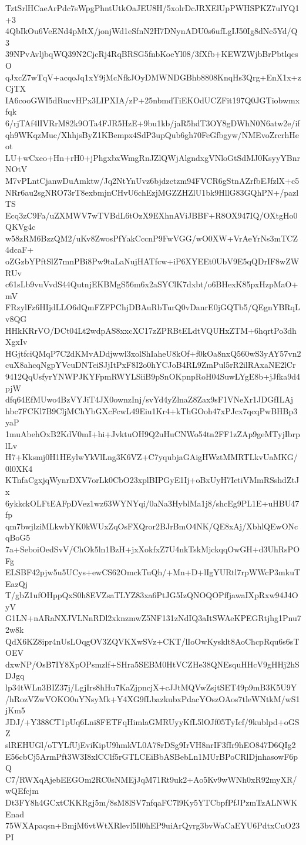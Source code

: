 TztSrlHCaeArPdc7sWpgPhntUtkOaJEU8H/5xolrDcJRXElUpPWHSPKZ7ulYQ1+3
4QbIkOu6VeENd4pMtX/jonjWd1eSfnN2H7DNynADU0s6ufLgIJ50Ig8dNc5Yd/Q3
39NPvAvljbqWQ39N2CjcRj4RqBRSG5fnbKoeYl08/3fXfb+KEWZWjbBrPbtlqcsO
qJxcZ7wTqV+acqoJq1xY9jMcNfkJOyDMWNDGBhb8808KnqHs3Qrg+EnX1x+zCjTX
IA6cooGWI5dRucvHPx3LIPXIA/zP+25nbmdTiEKOdUCZFit197Q0JGTiobwmxfqk
6/rjTAf4lIVRrM82k9OTa4FJR5HzE+9bu1kb/jaR5hdT3OY8gDWhN0N6atw2e/if
qh9WKqzMuc/XhhjsByZ1KBempx4SdP3upQub6gh70FeGfbgyw/NMEvoZrcrhHeot
LU+wCxeo+Hn+rH0+jPhgxbxWmgRnJZlQWjAlgndxgVNloGtSdMJ0KsyyYBnrNOtV
M7vPLntCjanwDuAmktw/Jq2NtYnUvz6bjdzctzm94FVCR6gStnAZrfbEJfzlX+c5
NRr6au2sgNRO73rT8exbmjnCHvU6chEzjMGZZHZlU1bk9HllG83GQhPN+/pazlTS
Ecq3zC9Fa/uZXMWV7wTVBdL6tOzX9EXhnAViJBBF+R8OX947IQ/OXtgHo0QKVg4c
w58zRM6BzzQM2/uKv8ZwosPfYakCccnP9FwVGG/wO0XW+VrAeYrNs3mTCZ4dcaF+
oZGzbYPftSlZ7mnPBi8Pw9taLaNujHATfcw+iP6XYEEt0UbV9E5qQDrIF8wZWRUv
c61sLb9vuVvdS44QutnjEKBMgS56m6x2aSYClK7dxbt/o6BHexK85pxHzpMaO+mV
FRzylFz6HIjdLLO6dQmFZFPChjDBAuRbTurQ0vDanrE0jGQTb5/QEgnYBRqLv8QG
HHkKRrVO/DCt04Lt2wdpAS8xxcXC17zZPRBtELdtVQUHxZTM+6hqrtPo3dhXgxIv
HGjtfciQMqP7C2dKMvADdjwwl3xolShIaheU8kOf+f0kOa8nxQ560wS3yAY57vn2
cuX8ahcqNgpYVcuDNTeiSJjItPxF8I2o0hYCJoB4RL9ZmPul5rR2ilRAxaNE2lCr
9412QqUsfyrYNWPJKYFpmRWYLSiiB9pSnOKpnpRoH04SuwLYgE8b+jJfka9d4pjW
dfq64EfMUwo4BzVYJiT4JX0ownzInj/svYd4yZlnaZ8Zax9sF1VNeXr1JDGfILAj
hbc7FCKl7B9CljMChYbGXcFcwL49Eiu1Kr4+kThGOoh47xPJcx7qcqPwBHBp3yaP
1muAbehOxB2KdV0mI+hi+JvktuOH9Q2uHuCNWo54tn2FF1zZAp9geMTyjIbrplLv
H7+Kksmj0H1HEylwYkVlLng3K6VZ+C7yqubjaGAigHWztMMRTLkvUaMKG/0l0XK4
KTnfaCgxjqWynrDXV7orLk0CbO23xplBIPGyE1Ij+oBxUyH7IetiVMmRSshdZtJx
6ykkckOLFtEAFpDVez1wz63WYNYqi/0aNa3HyblMa1j8/shcEg9PL1E+uHBU47fp
qm7bwjlziMLkwbYK0kWUxZqOsFXQror2BJrBmO4NK/QE8xAj/XbhlQEwONcqBoG5
7a+SeboiOedSvV/ChOk5ln1BzH+jxXokfxZ7U4nkTskMjckqqOwGH+d3UhRsPOFg
ELSBF42pjw5u5UCys+ewCS62OmckTuQh/+Mn+D+lIgYURtl7rpWWcP3mkuTEazQj
T/gbZ1ufOHppQxS0h8EVZsaTLYZ83xa6PtJG5IzQNOQOPffjawaIXpRxw94J4OyV
G1LN+nARaNXJVLNnRDl2xknzmwZ5NF131zNdIQ3aItSWAeKPEGRtjhg1Pnu72w8k
QdX6KZ8ipr4nUsLOqgOV3ZQVKXwSVz+CKT/lIoOwKysklt8AoChcpRqu6s6sTOEV
dxwNP/OsB7IY8XpOPsmzlf+SHra5SEBM0HtVCZHe38QNEsquHHcV9gHHj2hSDJgq
lp34tWLn3BIZ37j/LgjIrs8hHu7KaZjpncjX+cJJtMQVwZsjtSET49p9mB3K5U9Y
/hRozVZwVOKO0uYNsyMk+Y4XG9fLbazkubxPdacYOszOAos7tleWNtkM/wS1jKm5
JDJ/+Y388CT1pUq6Lni8FETFqHimlaGMRUyyKfL5lOJf05TyIcf/9kublpd+oGSZ
slREHUGl/oTYLfUjEviKipU9hmkVL0A78rDSg9IrVH8nrIF3fIr9hEO847D6QIg2
E56cbCj5ArmPft3W3I8xlCClf5rGTLCEiBbASBebLn1MUrBPoCRlDjnhasowF6pQ
C7/RWXqAjebEEGOm2RC0sNMEjJqM71Rt9uk2+Ao5Kv9wWNh0xR92myXR/wQEfcjm
Dt3FY8h4GCxtCKKRgj5m/8sM8lSV7nfqaFC7l9Ky5YTCbpfPfJPzmTzALNWKEnad
75WXApaqsn+BmjM6vtWtXRlevl5Il0hEP9uiArQyrg3bvWaCaEYU6PdtxCuO23PI
